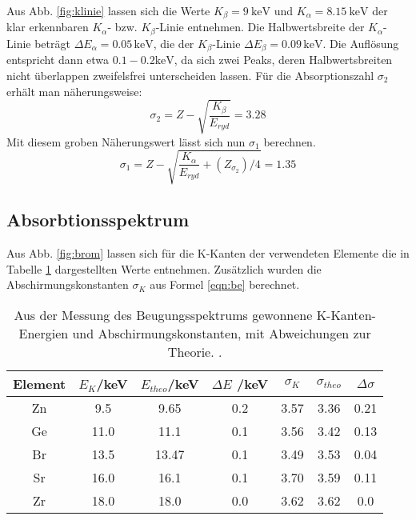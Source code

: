 Aus Abb. \ref{fig:klinie} lassen sich die Werte $K_\beta = \SI{9}{\kilo \eV}$ und $K_\alpha = \SI{8.15}{\kilo \eV}$ der klar erkennbaren $K_\alpha$- bzw. $K_\beta$-Linie entnehmen. Die Halbwertsbreite der $K_\alpha$-Linie beträgt $\Delta E_\alpha = 0.05 \,\si{\kilo \eV}$, die der $K_\beta$-Linie $\Delta E_\beta = 0.09 \, \si{\kilo \eV}$. Die Auflösung entspricht dann etwa $0.1-0.2 \si{\kilo \eV}$, da sich zwei Peaks, deren Halbwertsbreiten nicht überlappen zweifelsfrei unterscheiden lassen. Für die Absorptionszahl $\sigma_2$ erhält man näherungsweise:
\begin{equation*}
  \sigma_2 = Z-\sqrt{\frac{K_\beta}{E_{ryd}}}= 3.28
\end{equation*}
Mit diesem groben Näherungswert lässt sich nun $\sigma_1$ berechnen.
\begin{equation*}
  \sigma_1 = Z - \sqrt{\frac{K_\alpha}{E_{ryd}}+(Z_{\sigma_{2}})/4} = 1.35
\end{equation*}


\subsection{Absorbtionsspektrum}
\label{sec:absorption}
Aus Abb. \ref{fig:brom} lassen sich für die K-Kanten der verwendeten Elemente die in Tabelle \ref{tab:Kkanten} dargestellten Werte entnehmen. Zusätzlich wurden die Abschirmungskonstanten $\sigma_K$ aus Formel \eqref{eqn:be} berechnet.

\begin{table}
  \centering
  \caption{Aus der Messung des Beugungsspektrums gewonnene K-Kanten-Energien und Abschirmungskonstanten, mit Abweichungen zur Theorie. \cite{princeton}.}
  \label{tab:Kkanten}
  \begin{tabular}{|c|c|c|c|c|c|c|}
    \toprule
    Element & $E_K$/keV & $E_{theo}$/keV & $\Delta E$ /keV & $\sigma_K$ & $\sigma_{theo}$ & $\Delta \sigma$ \\
    \midrule
    Zn & 9.5 & 9.65 & 0.2 & 3.57 & 3.36 & 0.21\\
    Ge & 11.0 & 11.1 & 0.1 & 3.56 & 3.42 & 0.13\\
    Br  & 13.5 & 13.47 & 0.1 & 3.49 & 3.53 & 0.04\\
    Sr  & 16.0 & 16.1 & 0.1 & 3.70 & 3.59 & 0.11\\
    Zr  & 18.0 & 18.0 & 0.0 & 3.62 & 3.62 & 0.0 \\
    \bottomrule
    \end{tabular}
\end{table}

